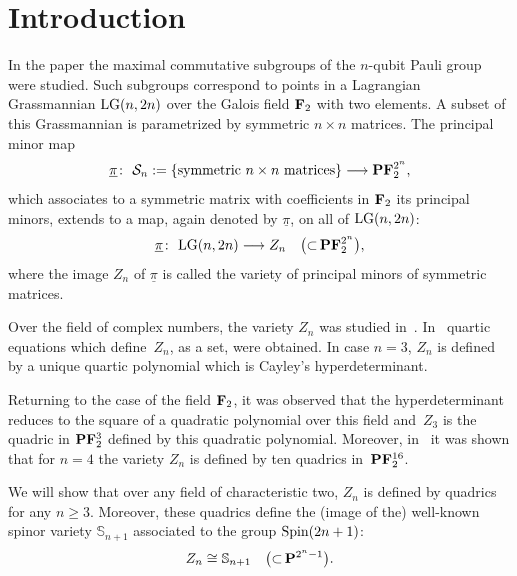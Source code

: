 \documentclass[pdftex]{sigma}
\newcommand{\FF}{{\bf F}}
\newcommand{\PP}{{\bf P}}
\newcommand{\bS}{{\mathbb S}}
\numberwithin{equation}{section}
\begin{document}

\section{Introduction}
In the paper \cite{HSL} the maximal commutative subgroups of the $n$-qubit Pauli group were studied. Such subgroups correspond to points in a Lagrangian Grassmannian ${\rm LG}(n,2n)$ over the Galois field $\FF_2$ with two elements. A subset of this Grassmannian is parametrized by symmetric $n\times n$ matrices. The principal minor map
\begin{gather*}
\underline{\pi}\colon \ {\cal S}_n := \{\text{symmetric}\ n\times n \ \text{matrices}\} \longrightarrow \PP\FF_2^{2^n} ,
\end{gather*}
which associates to a symmetric matrix with coefficients in $\FF_2$ its principal minors, extends to a map, again denoted by $\underline{\pi}$, on all of ${\rm LG}(n,2n)$:
\begin{gather*}
\underline{\pi}\colon \ {\rm LG}(n,2n) \longrightarrow Z_n\quad\big({\subset} \, \PP\FF_2^{2^n}\big),
\end{gather*}
where the image $Z_n$ of $\underline{\pi}$ is called the variety of principal minors of symmetric matrices.

Over the field of complex numbers, the variety $Z_n$ was studied in~\cite{HS}. In~\cite{Oeding} quartic equations which define~$Z_n$, as a set, were obtained. In case $n=3$, $Z_n$ is defined by a unique quartic polynomial which is Cayley's hyperdeterminant.

Returning to the case of the field $\FF_2$, it was observed that the hyperdeterminant reduces to the square of a quadratic polynomial over this field and~$Z_3$ is the quadric in $\PP\FF_2^3$ defined by this quadratic polynomial. Moreover, in~\cite{HSL} it was shown that for $n=4$ the variety $Z_n$ is defined by ten quadrics in~$\PP\FF_2^{16}$.

We will show that over any field of characteristic two, $Z_n$ is defined by quadrics for any $n\geq 3$. Moreover, these quadrics define the (image of the) well-known spinor variety $\bS_{n+1}$ associated to the group ${\rm Spin}(2n+1)$:
\begin{gather*}
Z_n \cong \bS_{n+1}\quad \big({\subset} \, \PP^{2^n-1}\big).
\end{gather*}
\end{document}
